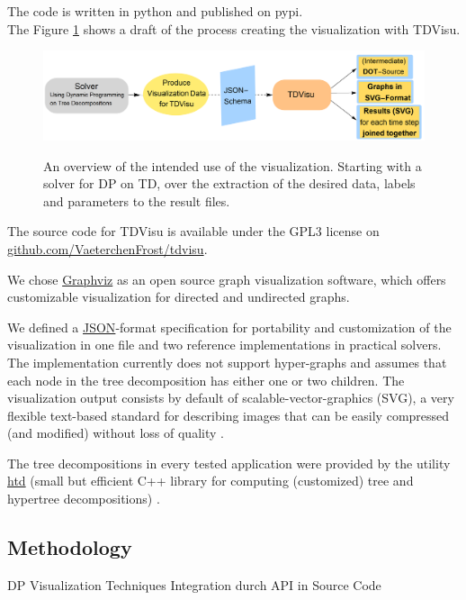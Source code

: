 \documentclass[a4paper, 12pt, bibliography=totoc]{scrartcl}
\begin{document}
The code is written in python and published on pypi.\\
The Figure \ref{fig:overviewprog} shows a draft of the process creating the visualization with TDVisu.

\begin{figure}
	\centering
		\includegraphics[width=1\linewidth]{images/OverviewProgram.png}
		\label{fig:overviewprog}
	\caption{An overview of the intended use of the visualization. Starting with a solver for DP on TD, over the extraction of the desired data, labels and parameters to the result files.}
		
\end{figure}

The source code for TDVisu is available under the GPL3 license on \url{github.com/VaeterchenFrost/tdvisu}.

We chose \href{https://graphviz.org/}{Graphviz} as an open source graph visualization software, which offers customizable visualization for directed and undirected graphs.

We defined a \href{https://www.json.org/json-en.html}{JSON}-format specification for portability and customization of the visualization in one file and two reference implementations in practical solvers.
The implementation currently does not support hyper-graphs and assumes that each node in the tree decomposition has either one or two children.
The visualization output consists by default of scalable-vector-graphics (SVG), a very flexible text-based standard for describing images that can be easily compressed (and modified) without loss of quality \cite{SVGMozilla}.

The tree decompositions in every tested application were provided by the utility \href{https://github.com/mabseher/htd}{htd} (small but efficient C++ library for computing (customized) tree and hypertree decompositions) \cite{htd}.


\subsection{Methodology}
DP
Visualization Techniques
Integration durch API in Source Code
\end{document}
